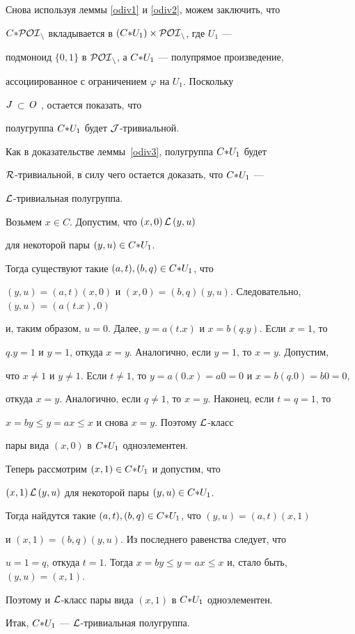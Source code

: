 \begin{pf}


Снова используя леммы \ref{odiv1} и \ref{odiv2}, можем заключить, что


$C{*} \cal{POI}_n$ вкладывается в $(C{*} U_1)\times\cal{POI}_n$, где $U_1$ ---


подмоноид $\{0,1\}$ в $\cal{POI}_n$, а $C{*} U_1$ --- полупрямое произведение,


ассоциированное с ограничением $\varphi$ на $U_1$. Поскольку


$\boldmath{J}$\,$\subset$\,$\boldmath{O}$ \cite{HIG2}, остается показать, что


полугруппа $C{*} U_1$ будет $\cal J$-тривиальной.





Как в доказательстве леммы~\ref{odiv3}, полугруппа $C{*} U_1$ будет


$\cal R$-тривиальной, в силу чего остается доказать, что $C{*} U_1$ ---


$\cal L$-тривиальная полугруппа.





Возьмем $x\in C$. Допустим, что $(x,0)\,{\cal L}\,(y,u)$


для некоторой пары $(y,u)\in C{*} U_1$.


Тогда существуют такие $(a,t),(b,q)\in C{*} U_1$, что


$(y,u)=(a,t)(x,0)$ и $(x,0)=(b,q)(y,u)$. Следовательно, $(y,u)=(a(t.x),0)$


и, таким образом, $u=0$. Далее, $y=a(t.x)$ и $x=b(q.y)$. Если $x=1$, то


$q.y=1$ и $y=1$, откуда $x=y$. Аналогично, если $y=1$, то $x=y$. Допустим,


что $x\neq1$ и $y\neq1$. Если $t\neq1$, то $y=a(0.x)=a0=0$ и $x=b(q.0)=b0=0$,


откуда $x=y$. Аналогично, если $q\neq1$, то $x=y$. Наконец, если $t=q=1$, то


$x=by\le y=ax\le x$ и снова $x=y$. Поэтому $\cal L$-класс


пары вида $(x,0)$ в $C{*} U_1$ одноэлементен.





Теперь рассмотрим $(x,1)\in C{*} U_1$ и допустим, что


$(x,1)\,{\cal L}\,(y,u)$ для некоторой пары $(y,u)\in C{*} U_1$.


Тогда найдутся такие $(a,t),(b,q)\in C{*} U_1$, что $(y,u)=(a,t)(x,1)$


и $(x,1)=(b,q)(y,u)$. Из последнего равенства следует, что


$u=1=q$, откуда $t=1$. Тогда $x=by\le y=ax\le x$ и, стало быть, $(y,u)=(x,1)$.


Поэтому и $\cal L$-класс пары вида $(x,1)$ в $C{*} U_1$ одноэлементен.


Итак, $C{*} U_1$ --- $\cal L$-тривиальная полугруппа.


\end{pf}





